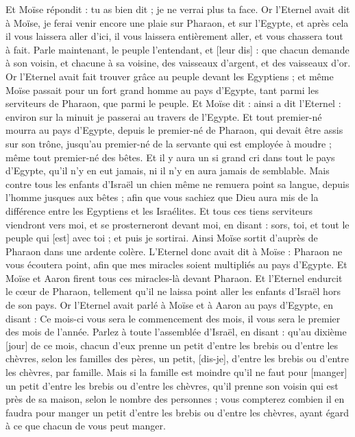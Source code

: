 \begin{multicols}{2}
Et Moïse répondit : tu as bien dit ; je ne verrai plus ta face.
\VerseOne{}Or l'Eternel avait dit à Moïse, je ferai venir encore une plaie sur Pharaon, et sur l'Egypte, et après cela il vous laissera aller d'ici, il vous laissera entièrement aller, et vous chassera tout à fait.
Parle maintenant, le peuple l'entendant, et [leur dis] : que chacun demande à son voisin, et chacune à sa voisine, des vaisseaux d'argent, et des vaisseaux d'or.
Or l'Eternel avait fait trouver grâce au peuple devant les Egyptiens ; et même Moïse passait pour un fort grand homme au pays d'Egypte, tant parmi les serviteurs de Pharaon, que parmi le peuple.
Et Moïse dit : ainsi a dit l'Eternel : environ sur la minuit je passerai au travers de l'Egypte.
Et tout premier-né mourra au pays d'Egypte, depuis le premier-né de Pharaon, qui devait être assis sur son trône, jusqu'au premier-né de la servante qui est employée à moudre ; même tout premier-né des bêtes.
Et il y aura un si grand cri dans tout le pays d'Egypte, qu'il n'y en eut jamais, ni il n'y en aura jamais de semblable.
Mais contre tous les enfants d'Israël un chien même ne remuera point sa langue, depuis l'homme jusques aux bêtes ; afin que vous sachiez que Dieu aura mis de la différence entre les Egyptiens et les Israélites.
Et tous ces tiens serviteurs viendront vers moi, et se prosterneront devant moi, en disant : sors, toi, et tout le peuple qui [est] avec toi ; et puis je sortirai. Ainsi Moïse sortit d'auprès de Pharaon dans une ardente colère.
L'Eternel donc avait dit à Moïse : Pharaon ne vous écoutera point, afin que mes miracles soient multipliés au pays d'Egypte.
Et Moïse et Aaron firent tous ces miracles-là devant Pharaon. Et l'Eternel endurcit le cœur de Pharaon, tellement qu'il ne laissa point aller les enfants d'Israël hors de son pays.
\VerseOne{}Or l'Eternel avait parlé à Moïse et à Aaron au pays d'Egypte, en disant :
Ce mois-ci vous sera le commencement des mois, il vous sera le premier des mois de l'année.
Parlez à toute l'assemblée d'Israël, en disant : qu'au dixième [jour] de ce mois, chacun d'eux prenne un petit d'entre les brebis ou d'entre les chèvres, selon les familles des pères, un petit, [dis-je], d'entre les brebis ou d'entre les chèvres, par famille.
Mais si la famille est moindre qu'il ne faut pour [manger] un petit d'entre les brebis ou d'entre les chèvres, qu'il prenne son voisin qui est près de sa maison, selon le nombre des personnes ; vous compterez combien il en faudra pour manger un petit d'entre les brebis ou d'entre les chèvres, ayant égard à ce que chacun de vous peut manger.

\end{multicols}
